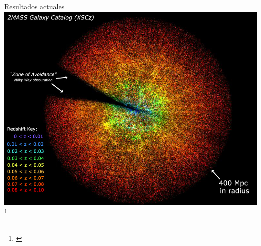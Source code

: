 \documentclass[handout]{beamer}
\newcommand\blfootnote[1]
{%
	\begingroup
	\renewcommand\thefootnote{}\footnote{#1}%
	\addtocounter{footnote}{-1}%
	\endgroup
}
\newcommand{\fcite}[1]{\blfootnote{\cite{#1}}}
\begin{document}
\begin{frame}{Resultados actuales}
	\centering
	\includegraphics[width = 0.7\linewidth]{sources/images/2Mass.jpg}	
	\fcite{skrutskie2006two}
\end{frame}
\end{document}
